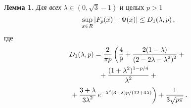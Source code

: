 \begin{multicols}{2}
\smallskip

\noindent
\textbf{Лемма 1.} %
\textit{Для всех}
 $\lambda \in \left(0,\sqrt{3}-1\right)$  и целых $p >1$
\begin{equation*}
\sup\limits_{x \in R} |F_p(x) - \IP(x)| \le D_1(\lambda,p)\,,
\end{equation*}
где
\begin{multline*}
D_1(\lambda, p)= \fr{2}{\pi p}\left (\fr{4}{9} +\fr{2(1-\lambda)}{(2-2\lambda-\lambda^2)^2}
+{}\right.{}\\
{}+\fr{(1+\lambda^2)^{1-p/4}}{\lambda^2}+{}\\
\left.{}+\fr{3+\lambda}{3\lambda^2}\,
e^{-\lambda^2(3-\lambda)p/(12+4\lambda)} \right )
+ \fr{1}{3\sqrt{p \pi}}\,.
\end{multline*}

\smallskip


\end{multicols}
